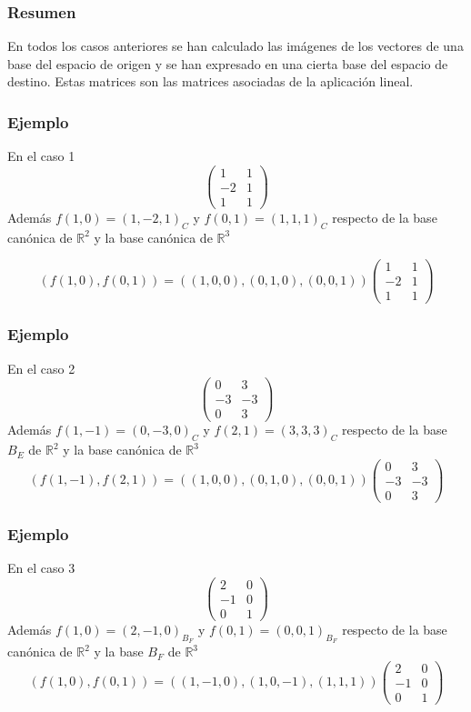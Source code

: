 \documentclass{beamer}
\begin{document}
   \begin{frame}
  \frametitle{Resumen}
En todos los casos anteriores se han calculado las im\'agenes de los vectores de una base del espacio de origen y se han expresado en una cierta base del espacio de destino. Estas matrices son las matrices asociadas de la aplicaci\'on lineal.
   \end{frame}

        \begin{frame}
  \frametitle{Ejemplo}
En el caso 1
 \[\left(\begin{array}{rr}1 & 1 \\-2 & 1 \\1 & 1\end{array}\right)\]
 Adem\'as $f(1,0) = (1,-2,1)_C$ y $f(0,1)=(1,1,1)_C$ respecto de la base can\'onica de $\mathbb R^2$ y la base can\'onica de $\mathbb R^3$

 \[ (f(1,0), f(0,1)) = ((1,0,0),(0,1,0),(0,0,1)) \left(\begin{array}{rr}1 & 1 \\-2 & 1 \\1 & 1\end{array}\right)\]
  \end{frame}
  
          \begin{frame}
  \frametitle{Ejemplo}
En el caso 2
 \[\left(\begin{array}{rr}0 & 3 \\-3 & -3 \\0 & 3\end{array}\right)\]
 Adem\'as $f(1,-1) = (0,-3,0)_C$ y $f(2,1)=(3,3,3)_C$ respecto de la base $B_E$ de $\mathbb R^2$ y la base can\'onica de $\mathbb R^3$
 \[ (f(1,-1), f(2,1)) = ((1,0,0),(0,1,0),(0,0,1)) \left(\begin{array}{rr}0 & 3 \\-3 & -3 \\0 & 3\end{array}\right)\]
  \end{frame}
  
 \begin{frame}
  \frametitle{Ejemplo}
En el caso 3
 \[\left(\begin{array}{rr}2 & 0 \\-1 & 0 \\0 & 1\end{array}\right)\]
 Adem\'as $f(1,0) = (2,-1,0)_{B_F}$ y $f(0,1)=(0,0,1)_{B_F}$ respecto de la base can\'onica de $\mathbb R^2$ y la base $B_F$ de $\mathbb R^3$
 \[ (f(1,0), f(0,1)) = ((1,-1,0),(1,0,-1),(1,1,1)) \left(\begin{array}{rr}2 & 0 \\-1 & 0 \\0 & 1\end{array}\right)\]
  \end{frame}
  
\end{document}
